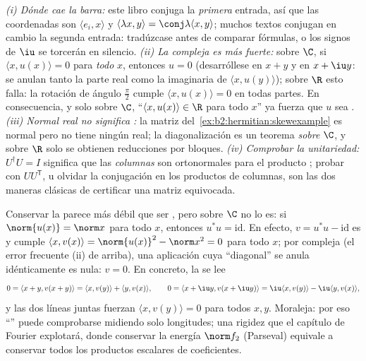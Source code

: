 \begin{remark}
\emph{(i) Dónde cae la barra:} este libro conjuga la \emph{primera}
entrada, así que las coordenadas son $\langle e_i, x\rangle$ y
$\langle\lambda x, y\rangle = \conj\lambda\langle x, y\rangle$;
muchos textos conjugan en cambio la segunda entrada: tradúzcase antes
de comparar fórmulas, o los signos de $\iu$ se torcerán en silencio.
\emph{(ii) La  compleja es más fuerte:} sobre $\C$, si
$\langle x, u(x)\rangle = 0$ para \emph{todo} $x$, entonces $u = 0$
(desarróllese en $x + y$ y en $x + \iu y$: se anulan tanto la parte
real como la imaginaria de $\langle x, u(y)\rangle$); sobre $\R$ esto
falla: la rotación de ángulo $\frac\pi2$ cumple $\langle x,
u(x)\rangle = 0$ en todas partes. En consecuencia, y solo sobre $\C$,
``$\langle x, u(x)\rangle \in \R$ para todo $x$'' ya fuerza que $u$
sea . \emph{(iii) Normal real no significa
:} la matriz del~\cref{ex:b2:hermitian:skewexample} es normal pero no tiene ningún
 real; la diagonalización  es un teorema
\emph{sobre} $\C$, y sobre $\R$ solo se obtienen reducciones por
bloques. \emph{(iv) Comprobar la unitariedad:} $U^\dagger U = I$
significa que las \emph{columnas} son ortonormales para el producto
; probar con $UU^{\mathsf T}$, u olvidar la conjugación en
los productos de columnas, son las dos maneras clásicas de certificar
una matriz equivocada.
\end{remark}

\begin{example}\label{ex:b2:hermitian:isometry}
Conservar la  parece más débil que ser , pero sobre
$\C$ no lo es: si $\norm{u(x)} = \norm x$ para todo $x$, entonces
$u^*u = \mathrm{id}$. En efecto, $v = u^*u - \mathrm{id}$ es
 y cumple $\langle x, v(x)\rangle = \norm{u(x)}^2 - \norm
x^2 = 0$ para todo $x$; por  compleja (el error frecuente
(ii) de arriba), una aplicación cuya ``diagonal'' se anula
idénticamente es nula: $v = 0$. En concreto, la  se lee
\[
0 = \langle x + y, v(x+y)\rangle
= \langle x, v(y)\rangle + \langle y, v(x)\rangle,
\qquad
0 = \langle x + \iu y, v(x + \iu y)\rangle
= \iu\langle x, v(y)\rangle - \iu\langle y, v(x)\rangle ,
\]
y las dos líneas juntas fuerzan $\langle x, v(y)\rangle = 0$ para
todos $x, y$. Moraleja: por eso ``'' puede comprobarse
midiendo solo longitudes; una rigidez que el capítulo de Fourier
explotará, donde conservar la energía $\norm f_2$ (Parseval) equivale
a conservar todos los productos escalares de coeficientes.
\end{example}

